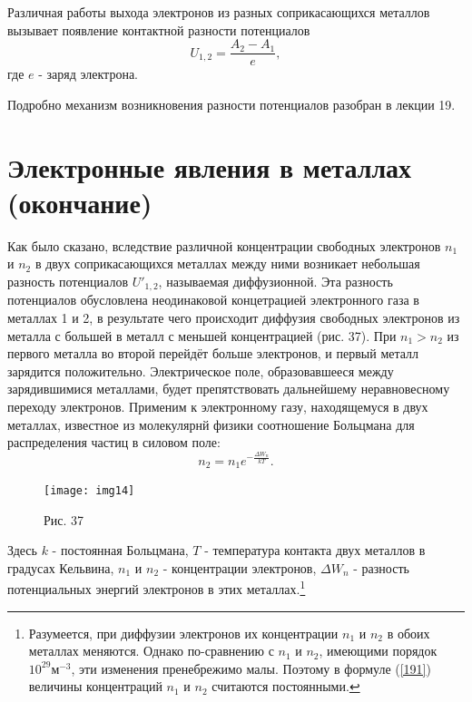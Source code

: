 \documentclass[a4paper,10pt]{book}
\begin{document}
Различная работы выхода электронов из разных соприкасающихся металлов вызывает появление контактной разности потенциалов
\begin{equation*}
 U_{1,2} = \frac{A_2 - A_1}{e},
\end{equation*}
где $e$ - заряд электрона.

Подробно механизм возникновения разности потенциалов разобран в лекции 19.
\chapter{Электронные явления в металлах (окончание)}
Как было сказано, вследствие различной концентрации свободных электронов $n_1$ и $n_2$ в двух соприкасающихся металлах между ними возникает небольшая разность потенциалов $U'_{1,2}$, называемая диффузионной. Эта разность потенциалов обусловлена неодинаковой концетрацией электронного газа в металлах 1 и 2, в результате чего происходит диффузия свободных электронов из металла с большей в металл с меньшей концентрацией (рис. 37). При $n_1 > n_2$ из первого металла во второй перейдёт больше электронов, и первый металл зарядится положительно. Электрическое поле, образовавшееся между зарядившимися металлами, будет препятствовать дальнейшему неравновесному переходу электронов. Применим к электронному газу, находящемуся в двух металлах, известное из молекулярнй физики соотношение Больцмана для распределения частиц в силовом поле:
\begin{equation}\label{191}
 n_2 = n_1e^{-\frac{\Delta W_n}{kT}}.
\end{equation}

\begin{figure}[h]
\texttt{[image: img14]}
\caption{Рис. 37}
\label{img14}
\end{figure}
Здесь $k$ - постоянная Больцмана, $T$ - температура контакта двух металлов в градусах Кельвина, $n_1$ и $n_2$ - концентрации электронов, $\Delta W_n$ - разность потенциальных энергий электронов в этих металлах.\footnote{Разумеется, при диффузии электронов их концентрации $n_1$ и $n_2$ в обоих металлах меняются. Однако по-сравнению с $n_1$ и $n_2$, имеющими порядок $10^29\text{м}^{-3}$, эти изменения пренебрежимо малы. Поэтому в формуле (\ref{191}) величины концентраций $n_1$ и $n_2$ считаются постоянными.}
\end{document}
